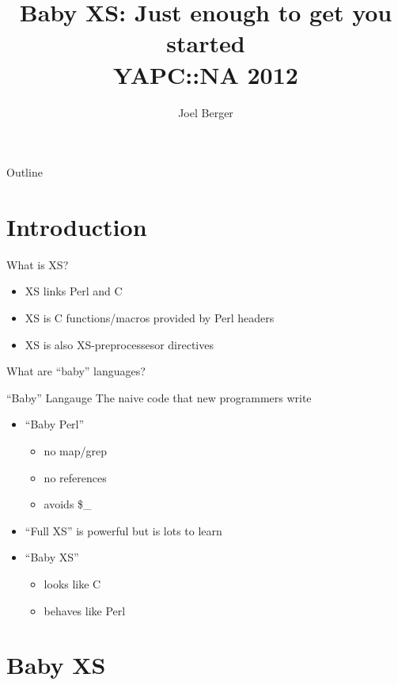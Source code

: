 \documentclass{beamer}
\title[Baby XS]{Baby XS: Just enough to get you started\\YAPC::NA 2012}
\author{Joel Berger}
\institute[UIC]{University of Illinois at Chicago}
\begin{document}
\begin{frame}
  \maketitle
\end{frame}

\begin{frame}{Outline}
  \tableofcontents
\end{frame}

\section{Introduction}

\begin{frame}{What is XS?}
  \begin{itemize}
    \item XS links Perl and C
    \item XS is C functions/macros provided by Perl headers
    \item XS is also XS-preprocessesor directives
  \end{itemize}
\end{frame}

\begin{frame}{What are ``baby'' languages?}
  \begin{block}{``Baby'' Langauge}
    The naive code that new programmers write
  \end{block}
  \begin{itemize}
    \item ``Baby Perl''
      \begin{itemize}
        \item no map/grep
        \item no references
        \item avoids \$\_
      \end{itemize}
    \item ``Full XS'' is powerful but is lots to learn
    \item ``Baby XS'' 
     \begin{itemize}
       \item looks like C
       \item behaves like Perl
     \end{itemize}
  \end{itemize}
\end{frame}

\section{Baby XS}
\end{document}
